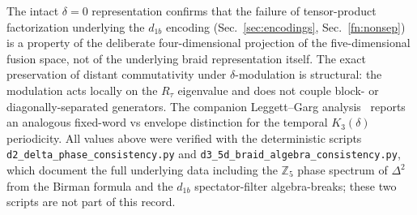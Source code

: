 \documentclass[aps,pra,twocolumn,superscriptaddress,longbibliography,floatfix,nofootinbib]{revtex4-2}
\begin{document}
The intact $\delta = 0$ representation confirms that the
failure of tensor-product factorization underlying the $d_{1b}$ encoding
(Sec.~\ref{sec:encodings}, Sec.~\ref{fn:nonsep}) is a property of
the deliberate four-dimensional projection of the
five-dimensional fusion space, not of the underlying braid
representation itself. The exact preservation of distant commutativity
under $\delta$-modulation is structural: the modulation acts locally
on the $R_\tau$ eigenvalue and does not couple block- or
diagonally-separated generators. The companion Leggett--Garg
analysis~\cite{Sayim2026LGI} reports an analogous fixed-word vs
envelope distinction for the temporal $K_3(\delta)$ periodicity.
All values above were verified with the deterministic scripts
\texttt{d2\_delta\_phase\_consistency.py} and
\texttt{d3\_5d\_braid\_algebra\_consistency.py}, which document the
full underlying data including the $\mathbb{Z}_5$ phase spectrum of
$\Delta^2$ from the Birman formula and the $d_{1b}$ spectator-filter
algebra-breaks; these two scripts are not part of this record.

\end{document}
